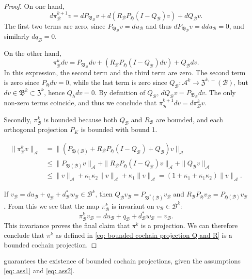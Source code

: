 \documentclass[reqno]{amsart}
\numberwithin{equation}{section}
\theoremstyle{definition}
\newcommand{\Ac}{\mathcal{A}}
\newcommand{\Bc}{\mathcal{B}}
\newcommand{\Hf}{\mathfrak{H}}
\newcommand{\Bf}{\mathfrak{B}}
\newcommand{\Zf}{\mathfrak{Z}}
\begin{document}
\begin{proof}
On one hand, 
\begin{equation}
d\pi_\Bc^{k+1} v = dP_{\Bf_\Bc} v + d(R_\Bc P_\Hf (I - Q_\Bc ) v) + dQ_\Bc v.
\end{equation}
The first two terms are zero, since $P_{\Bf_\Bc} v = du_\Bc$ and thus $dP_{\Bf_\Bc} v= ddu_\Bc = 0$, and similarly $dq_\Bc = 0$.

On the other hand, 
\begin{equation}
\pi_\Bc^k dv = P_{\Bf_\Bc} dv + (R_\Bc P_\Hf (I - Q_\Bc) dv) + Q_\Bc dv.
\end{equation}
In this expression, the second term and the third term are zero. The second term is zero since $P_\Hf dv = 0$, while the last term is zero since $Q_\Bc: \Ac^k \to \Zf^{k,\perp}(\Bc)$, but $dv \in \Bf^k \subset \Zf^k$, hence $Q_h dv = 0$. By definition of $Q_\Bc$, $dQ_\Bc v = P_{\Bf_\Bc} dv$. The only non-zero terms coincide, and thus we conclude that $\pi_\Bc^{k+1} dv = d\pi^k_\Bc v$.


Secondly, $\pi^k_\Bc$ is bounded because both $Q_\Bc$ and $R_\Bc$ are bounded, and each orthogonal projection $P_K$ is bounded with bound 1.

\begin{subequations}
\begin{align}
\| \pi_\Bc^k v\|_\Ac &= \|(P_{\mathfrak{B}(\Bc)} + R_\Bc P_{\mathfrak{H}}(I - Q_\Bc) + Q_\Bc)v \|_\Ac \\
&\leq  \| P_{\mathfrak{B}(\Bc)}v \|_\Ac + \| R_\Bc P_{\mathfrak{H}}(I - Q_\Bc)v \|_\Ac + \| Q_\Bc v \|_\Ac \\ 
&\leq \|v\|_\Ac + \kappa_1 \kappa_2 \|v\|_\Ac + \kappa_1 \|v\|_\Ac = (1 + \kappa_1 + \kappa_1 \kappa_2) \|v\|_\Ac.
\end{align}
\end{subequations}

If $v_\Bc = du_\Bc + q_\Bc + d^*_\Bc w_\Bc \in \Bc^k$, then $Q_\Bc v_\Bc = P_{\Bf^*(\Bc)} v_\Bc$ and $R_\Bc P_{\Hf} v_\Bc = P_{\Hf(\Bc)} v_\Bc$. From this we see that the map $\pi_\Bc^k$ is invariant on $v_\Bc \in \Bc^k$: 
\begin{equation}
\pi_\Bc^k v_\Bc = du_\Bc + q_\Bc + d^*_\Bc w_\Bc = v_\Bc.
\end{equation}
This invariance proves the final claim that $\pi^k$ is a projection. We can therefore conclude that $\pi^k$ as defined in \cref{eq: bounded cochain projection Q and R} is a bounded cochain projection.
\end{proof}

 guarantees the existence of bounded cochain projections, given the assumptions \cref{eq: ass1} and \cref{eq: ass2}. 
\end{document}
